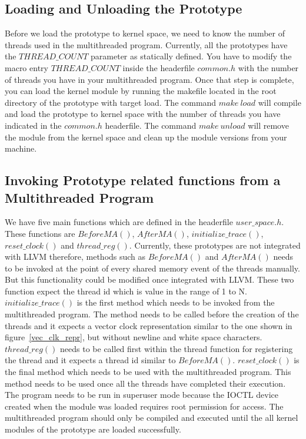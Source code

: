 \subsection*{Loading and Unloading the Prototype}

Before we load the prototype to kernel space, we need to know the number of threads used in the multithreaded program. 
Currently, all the prototypes have the $THREAD\_COUNT$ parameter as statically defined. 
You have to modify the macro entry $THREAD\_COUNT$ inside the headerfile $common.h$ with the number of threads you have in your multithreaded program. 
Once that step is complete, you can load the kernel module by running the makefile located in the root directory of the prototype with target load. 
The command $make\ load$ will compile and load the prototype to kernel space with the number of threads you have indicated in the $common.h$ headerfile. 
The command $make\ unload$ will remove the module from the kernel space and clean up the module versions from your machine. 

\subsection*{Invoking Prototype related functions from a Multithreaded Program}

We have five main functions which are defined in the headerfile $user\_space.h$. 
These functions are $BeforeMA()$, $AfterMA()$, $initialize\_trace()$, $reset\_clock()$ and $thread\_reg()$. 
Currently, these prototypes are not integrated with LLVM therefore, methods such as $BeforeMA()$ and $AfterMA()$ needs to be invoked at the point of every shared memory event of the threads manually. 
But this functionality could be modified once integrated with LLVM. 
These two function expect the thread id which is value in the range of 1 to N. 
$initialize\_trace()$ is the first method which needs to be invoked from the multithreaded program. 
The method needs to be called before the creation of the threads and it expects a vector clock representation similar to the one shown in figure~\ref{vec_clk_repr}, but without newline and white space characters. 
$thread\_reg()$ needs to be called first within the thread function for registering the thread and it expects a thread id similar to $BeforeMA()$. 
$reset\_clock()$ is the final method which needs to be used with the multithreaded program. 
This method needs to be used once all the threads have completed their execution. 
The program needs to be run in superuser mode because the IOCTL device created when the module was loaded requires root permission for access. 
The multithreaded program should only be compiled and executed until the all kernel modules of the prototype are loaded successfully.  




